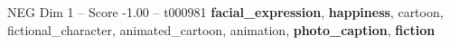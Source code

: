 \begin{textsample}{NEG Dim 1 – Score -1.00 – t000981}  \label{ex:f1_neg_036}
\textbf{facial\_expression}, \textbf{happiness}, cartoon, fictional\_character, animated\_cartoon, animation, \textbf{photo\_caption}, \textbf{fiction}

\end{textsample}
